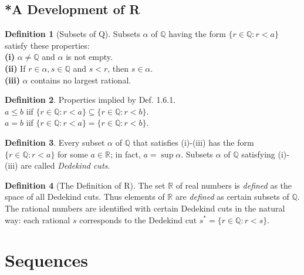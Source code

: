\documentclass{book}
\theoremstyle{definition}
\newtheorem{definition}{Definition}[section]
\begin{document}
\section{*A Development of R}
\begin{definition}[Subsets of Q]
Subsets $\alpha$ of $\mathbb{Q}$ having the form $\{r \in \mathbb{Q}:r < a\}$ satisfy these properties:
\\ \textbf{(i)} $\alpha \neq \mathbb{Q}$ and $\alpha$ is not empty.
\\ \textbf{(ii)} If $r \in \alpha, s \in \mathbb{Q}$ and $s < r$, then $s \in \alpha$.
\\ \textbf{(iii)} $\alpha$ contains no largest rational.
\end{definition}
\begin{definition} Properties implied by Def. 1.6.1.
\\$a \leq b$ iif $\{r \in \mathbb{Q}:r<a\} \subseteq \{r \in \mathbb{Q}:r < b\}$.
\\ $a = b$ iif $\{r \in \mathbb{Q}: r < a\} = \{r \in \mathbb{Q}: r < b\}$.
\end{definition}
\begin{definition}
Every subset $\alpha$ of $\mathbb{Q}$ that satisfies (i)-(iii) has the form $\{r \in \mathbb{Q}: r < a\}$ for some $a \in \mathbb{R}$; in fact, $a = \sup \alpha$. Subsets $\alpha$ of $\mathbb{Q}$ satisfying (i)-(iii) are called \textit{Dedekind cuts}.
\end{definition}

% 
\begin{definition}[The Definition of R]
The set $\mathbb{R}$ of real numbers is \textit{defined} as the space of all Dedekind cuts. Thus elements of $\mathbb{R}$ are \textit{defined} as certain subsets of $\mathbb{Q}$. The rational numbers are identified with certain Dedekind cuts in the natural way: each rational $s$ corresponds to the Dedekind cut $s^* = \{r \in \mathbb{Q}: r < s\}$. 
\end{definition}
\chapter{Sequences}
\end{document}
